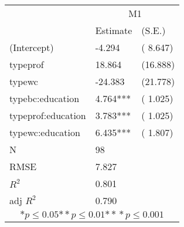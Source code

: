 \begin{tabular}{*{3}{l}}
\hline
                  & \multicolumn{2}{c}{M1}   \tabularnewline
                   &Estimate  &(S.E.)  \tabularnewline
 \hline
 \hline
   (Intercept)     &-4.294   &   ( 8.647) \tabularnewline
   typeprof        &18.864   &   (16.888) \tabularnewline
   typewc          &-24.383   &   (21.778) \tabularnewline
   typebc:education    &4.764***   &   ( 1.025) \tabularnewline
   typeprof:education    &3.783***   &   ( 1.025) \tabularnewline
   typewc:education    &6.435***   &   ( 1.807) \tabularnewline
 \hline
 N                 &98       &        \tabularnewline
 RMSE             &7.827         & \tabularnewline
 $R^2$             &0.801         & \tabularnewline
 adj $R^2$         &0.790         & \tabularnewline
 \hline
\hline
 
 \multicolumn{3}{c}{${*  p}\le 0.05$${*\!\!*  p}\le 0.01$${*\!\!*\!\!*  p}\le 0.001$}\tabularnewline
 \end{tabular}